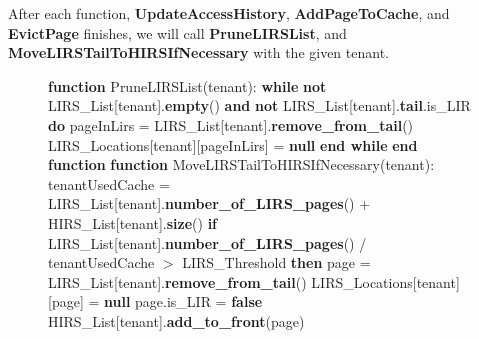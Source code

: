 \newpage

After each function, \textbf{UpdateAccessHistory}, \textbf{AddPageToCache}, and \textbf{EvictPage} 
finishes, we will call \textbf{PruneLIRSList}, and \textbf{MoveLIRSTailToHIRSIfNecessary} with the 
given tenant.

\begin{figure}[htbp]
    \centering
    \begin{minipage}{\linewidth}
    \begin{algorithm}[H]
        \begin{algorithmic}
            \STATE \textbf{function} PruneLIRSList(tenant):
            \STATE \hspace{\algorithmicindent} \textbf{while} \textbf{not} LIRS\_List[tenant].\textbf{empty}() \textbf{and} \textbf{not} LIRS\_List[tenant].\textbf{tail}.is\_LIR \textbf{do}
            \STATE \hspace{\algorithmicindent} \hspace{\algorithmicindent} pageInLirs = LIRS\_List[tenant].\textbf{remove\_from\_tail}()
            \STATE \hspace{\algorithmicindent} \hspace{\algorithmicindent} LIRS\_Locations[tenant][pageInLirs] = \textbf{null}
            \STATE \hspace{\algorithmicindent} \textbf{end while}
            \STATE \textbf{end function}
            \STATE
            \STATE \textbf{function} MoveLIRSTailToHIRSIfNecessary(tenant):
            \STATE \hspace{\algorithmicindent} tenantUsedCache = LIRS\_List[tenant].\textbf{number\_of\_LIRS\_pages}() + HIRS\_List[tenant].\textbf{size}()
            \STATE \hspace{\algorithmicindent} \textbf{if} LIRS\_List[tenant].\textbf{number\_of\_LIRS\_pages}() / tenantUsedCache $>$ LIRS\_Threshold \textbf{then}
            \STATE \hspace{\algorithmicindent} \hspace{\algorithmicindent} page = LIRS\_List[tenant].\textbf{remove\_from\_tail}()
            \STATE \hspace{\algorithmicindent} \hspace{\algorithmicindent} LIRS\_Locations[tenant][page] = \textbf{null}
            \STATE \hspace{\algorithmicindent} \hspace{\algorithmicindent} page.is\_LIR = \textbf{false}
            \STATE \hspace{\algorithmicindent} \hspace{\algorithmicindent} HIRS\_List[tenant].\textbf{add\_to\_front}(page)

\end{algorithmic}
\end{algorithm}
\end{minipage}
\end{figure}

